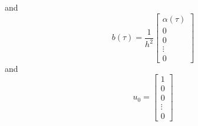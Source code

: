 \documentclass{article}
\begin{document}
and
\begin{equation*}
  b(\tau) = \frac{1}{h^2} 
  \begin{bmatrix}
    \alpha(\tau) \\
    0                        \\
    0                        \\
    \vdots                   \\
    0
  \end{bmatrix}
\end{equation*}
and
\begin{equation*}
  u_0 =
  \begin{bmatrix}
    1      \\
    0      \\
    0      \\
    \vdots \\
    0
  \end{bmatrix}
\end{equation*}
\end{document}
